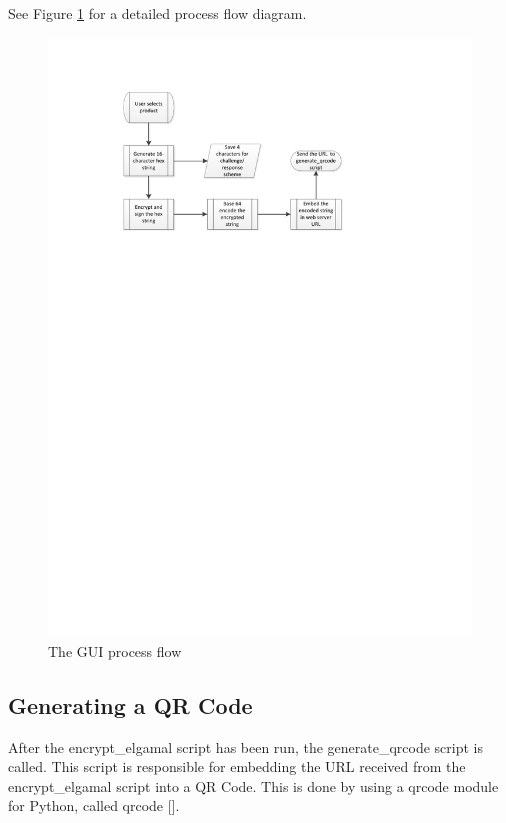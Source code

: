 See Figure \ref{fig:gen-prod-code-processflow} for a detailed process flow
diagram.

\begin{figure}
 \centering 
 \includegraphics[clip=true, trim
 = 0 550 0 70, scale=0.7]{generate_product_code_processflow}
 \caption{The GUI process flow}
 \label{fig:gen-prod-code-processflow}
\end{figure}

\subsection{Generating a QR Code}
\label{sec:gen-qrcode}

After the encrypt\_elgamal script has been run, the generate\_qrcode script is
called. This script is responsible for embedding the URL received from the
encrypt\_elgamal script into a QR Code. This is done by using a qrcode module
for Python, called qrcode [\cite{website:qrcode-generator}].

